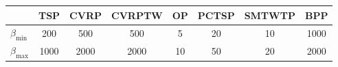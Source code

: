 \begin{tabular}{lccccccc}
\toprule
 & TSP & CVRP & CVRPTW & OP & PCTSP  & SMTWTP & BPP \\
\midrule
$\beta_{\text{min}}$ & 200 & 500 & 500 & 5 & 20 & 10 & 1000\\
$\beta_{\text{max}}$ & 1000 & 2000 & 2000 & 10 & 50 & 20 & 2000\\
\bottomrule
\end{tabular}